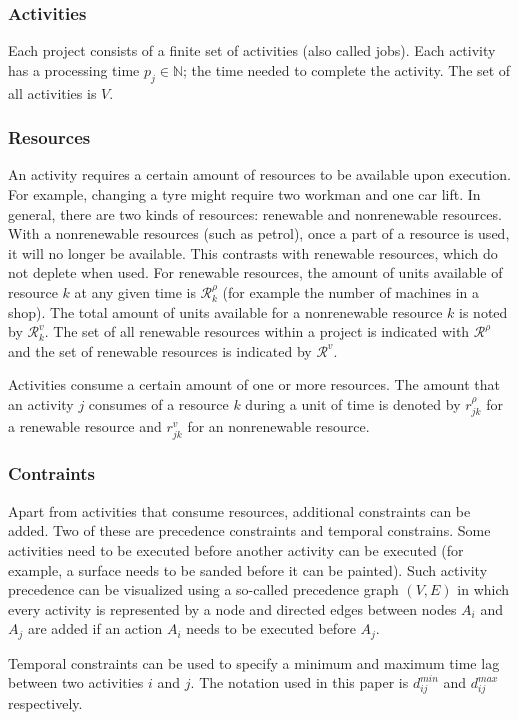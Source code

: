 \documentclass{article}
\begin{document}
\subsubsection{Activities}
Each project consists of a finite set of activities (also called jobs). Each activity has a processing time $p_{j} \in \mathbb{N}$; the time needed to complete the activity. The set of all activities is $V$.

\subsubsection{Resources}
An activity requires a certain amount of resources to be available upon execution. For example, changing a tyre might require two workman and one car lift. In general, there are two kinds of resources: renewable and nonrenewable resources. With a nonrenewable resources (such as petrol), once a part of a resource is used, it will no longer be available. This contrasts with renewable resources, which do not deplete when used. For renewable resources, the amount of units available of resource $k$ at any given time is $\mathcal{R}^{\rho}_k$ (for example the number of machines in a shop). The total amount of units available for a nonrenewable resource $k$ is noted by $\mathcal{R}^{v}_k$. The set of all renewable resources within a project is indicated with $\mathcal{R}^{\rho}$ and the set of renewable resources is indicated by $\mathcal{R}^{v}$. 

Activities consume a certain amount of one or more resources. The amount that an activity $j$ consumes of a resource $k$ during a unit of time is denoted by $r^{\rho}_{jk}$ for a renewable resource and  $r^{v}_{jk}$ for an nonrenewable resource. 

\subsubsection{Contraints}
Apart from activities that consume resources, additional constraints can be added. Two of these are precedence constraints and temporal constrains. Some activities need to be executed before another activity can be executed (for example, a surface needs to be sanded before it can be painted). Such activity precedence can be visualized using a so-called precedence graph $(V, E)$ in which every activity is represented by a node and directed edges between nodes $A_i$ and $A_j$ are added if an action $A_i$ needs to be executed before $A_j$.

Temporal constraints can be used to specify a minimum and maximum time lag between two activities $i$ and $j$. The notation used in this paper is $d^{min}_{ij}$ and $d^{max}_{ij}$ respectively.
\end{document}
